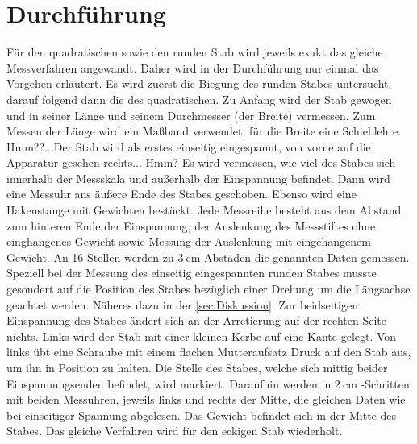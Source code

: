 \section{Durchführung}
\label{sec:Durchführung}
Für den quadratischen sowie den runden Stab wird jeweils exakt das gleiche Messverfahren 
angewandt. Daher wird in der Durchführung nur einmal das Vorgehen erläutert. 
Es wird zuerst die Biegung des runden Stabes untersucht, darauf folgend dann die 
des quadratischen. Zu Anfang wird der Stab gewogen und in seiner Länge und seinem 
Durchmesser (der Breite) vermessen. Zum Messen der Länge wird ein Maßband verwendet,
für die Breite eine Schieblehre. Hmm??...Der Stab wird als erstes einseitig eingespannt, 
von vorne auf die Apparatur gesehen rechts... Hmm? Es wird vermessen, wie viel des Stabes 
sich innerhalb der Messskala und außerhalb der Einspannung befindet. Dann wird eine 
Messuhr ans äußere Ende des Stabes geschoben. Ebenso wird eine Hakenstange mit Gewichten 
bestückt. Jede Messreihe besteht aus dem Abstand zum hinteren Ende der Einspannung, der 
Auslenkung des Messstiftes ohne einghangenes Gewicht sowie Messung der Auslenkung mit 
eingehangenem Gewicht. An 16 Stellen werden zu $\qty{3}{\centi\meter}$-Abstäden die 
genannten Daten gemessen. Speziell bei der Messung des einseitig eingespannten runden 
Stabes musste gesondert auf die Position des Stabes bezüglich einer Drehung um die 
Längsachse geachtet werden. Näheres dazu in der \autoref{sec:Diskussion}. Zur 
beidseitigen Einspannung des Stabes ändert sich an der Arretierung auf der rechten 
Seite nichts. Links wird der Stab mit einer kleinen Kerbe auf eine Kante gelegt. 
Von links übt eine Schraube mit einem flachen Mutteraufsatz Druck auf den Stab aus,
um ihn in Position zu halten. Die Stelle des Stabes, welche sich mittig beider 
Einspannungsenden befindet, wird markiert. Daraufhin werden in $\qty{2}{\centi\meter}$
-Schritten mit beiden Messuhren, jeweils links und rechts der Mitte, die gleichen 
Daten wie bei einseitiger Spannung abgelesen. Das Gewicht befindet sich in der Mitte 
des Stabes. Das gleiche Verfahren wird für den eckigen Stab wiederholt. 